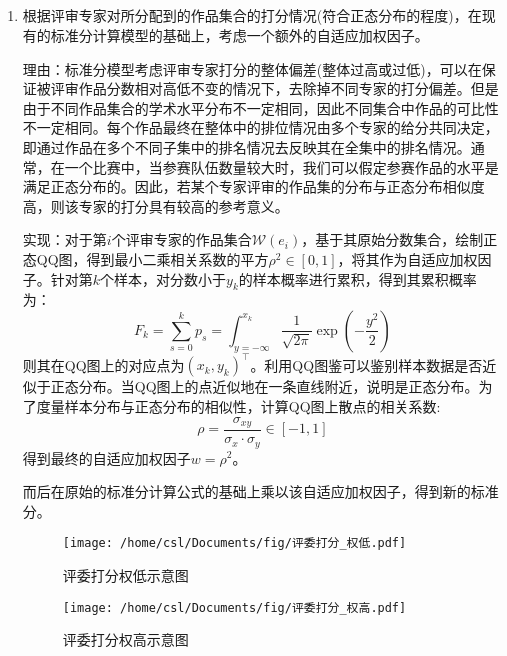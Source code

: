 \documentclass[12pt, onecolumn]{article}
\newcommand\normf{\fangsong}
\begin{document}
	\subsection{\normf{评分模型}}
	\begin{enumerate}
		\item 根据评审专家对所分配到的作品集合的打分情况(符合正态分布的程度)，在现有的标准分计算模型的基础上，考虑一个额外的自适应加权因子。
	
		理由：标准分模型考虑评审专家打分的整体偏差(整体过高或过低)，可以在保证被评审作品分数相对高低不变的情况下，去除掉不同专家的打分偏差。但是由于不同作品集合的学术水平分布不一定相同，因此不同集合中作品的可比性不一定相同。每个作品最终在整体中的排位情况由多个专家的给分共同决定，即通过作品在多个不同子集中的排名情况去反映其在全集中的排名情况。通常，在一个比赛中，当参赛队伍数量较大时，我们可以假定参赛作品的水平是满足正态分布的。因此，若某个专家评审的作品集的分布与正态分布相似度高，则该专家的打分具有较高的参考意义。
		
		实现：对于第$i$个评审专家的作品集合$\mathcal{W}(e_i)$，基于其原始分数集合，绘制正态QQ图，得到最小二乘相关系数的平方$\rho^2\in[0,1]$，将其作为自适应加权因子。针对第$k$个样本，对分数小于$y_k$的样本概率进行累积，得到其累积概率为：
		\begin{equation*}
			F_k=\sum_{s=0}^{k}p_s=\int_{y=-\infty}^{x_k}\frac{1}{\sqrt{2\pi}}\exp\left( -\frac{y^2}{2}\right) 
		\end{equation*}
		则其在QQ图上的对应点为$(x_k,y_k)^\top$。利用QQ图鉴可以鉴别样本数据是否近似于正态分布。当QQ图上的点近似地在一条直线附近，说明是正态分布。为了度量样本分布与正态分布的相似性，计算QQ图上散点的相关系数:
		\begin{equation*}
		\rho=\frac{\sigma_{xy}}{\sigma_x\cdot\sigma_y}\in[-1,1]
		\end{equation*}
		得到最终的自适应加权因子$w=\rho^2$。
		
		而后在原始的标准分计算公式的基础上乘以该自适应加权因子，得到新的标准分。
		
			\begin{figure}[h]
			\centering
			\texttt{[image: /home/csl/Documents/fig/评委打分\_权低.pdf]}
			\caption{\normf 评委打分权低示意图}
		\end{figure}
		\begin{figure}[h]
		\centering
		\texttt{[image: /home/csl/Documents/fig/评委打分\_权高.pdf]}
		\caption{\normf 评委打分权高示意图}
	\end{figure}
		

\end{enumerate}
\end{document}
